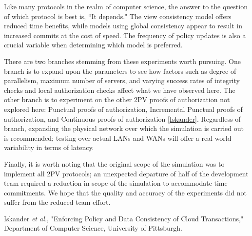 \documentclass[11pt]{article}
\begin{document}
Like many protocols in the realm of computer science, the answer to the question of which protocol is best is, ``It depends." The view consistency model offers reduced time benefits, while models using global consistency appear to result in increased commits at the cost of speed. The frequency of policy updates is also a crucial variable when determining which model is preferred.

There are two branches stemming from these experiments worth pursuing. One branch is to expand upon the parameters to see how factors such as degree of parallelism, maximum number of servers, and varying success rates of integrity checks and local authorization checks affect what we have observed here. The other branch is to experiment on the other 2PV proofs of authorization not explored here: Punctual proofs of authorization, Incremental Punctual proofs of authorization, and Continuous proofs of authorization \ref{Iskander}. Regardless of branch, expanding the physical network over which the simulation is carried out is recommended; testing over actual LANs and WANs will offer a real-world variability in terms of latency.

Finally, it is worth noting that the original scope of the simulation was to implement all 2PV protocols; an unexpected departure of half of the development team required a reduction in scope of the simulation to accommodate time commitments. We hope that the quality and accuracy of the experiments did not suffer from the reduced team effort.
\begin{thebibliography}{9}
 Iskander \emph{et al.}, "Enforcing Policy and Data Consistency of Cloud Transactions," Department of Computer Science, University of Pittsburgh.
\end{thebibliography}
\end{document}
